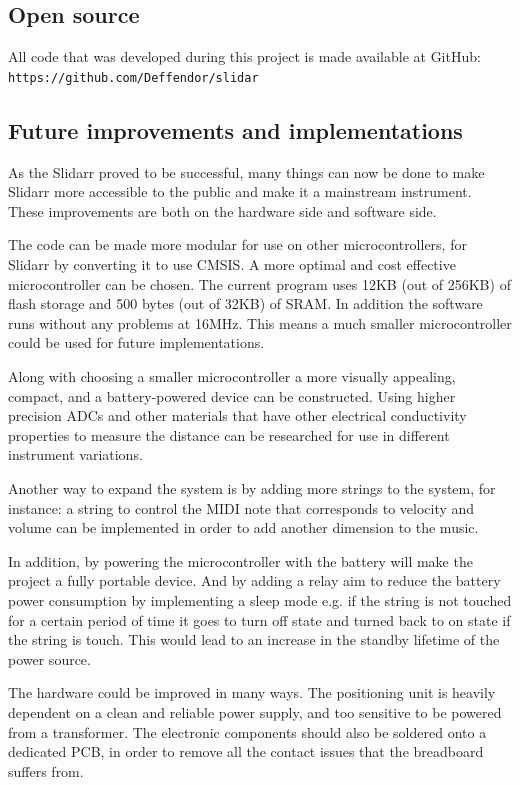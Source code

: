 \documentclass{article}
\begin{document}
\subsection{Open source}
All code that was developed during this project is made available at GitHub: \texttt{https://github.com/Deffendor/slidar}

\subsection{Future improvements and implementations}
As the Slidarr proved to be successful, many things can now be done to make Slidarr more accessible to the public and make it a mainstream instrument. These improvements are both on the hardware side and software side.

The code can be made more modular for use on other microcontrollers, for Slidarr by converting it to use CMSIS. A more optimal and cost effective microcontroller can be chosen. The current program uses 12KB (out of 256KB) of flash storage and 500 bytes (out of 32KB) of SRAM. In addition the software runs without any problems at 16MHz. This means a much smaller microcontroller could be used for future implementations.

Along with choosing a smaller microcontroller a more visually appealing, compact, and a battery-powered device can be constructed. Using higher precision ADCs and other materials that have other electrical conductivity properties to measure the distance can be researched for use in different instrument variations.

Another way to expand the system is by adding more strings to the system, for instance: a string to control the MIDI note that corresponds to velocity and volume can be implemented in order to add another dimension to the music.

In addition, by powering the microcontroller with the battery will make the project a fully portable device. And by adding a relay aim to reduce the battery power consumption by implementing a sleep mode e.g. if the string is not touched for a certain period of time it goes to turn off state and turned back to on state if the string is touch. This would lead to an increase in the standby lifetime of the power source.

The hardware could be improved in many ways. The positioning unit is heavily dependent on a clean and reliable power supply, and too sensitive to be powered from a transformer. The electronic components should also be soldered onto a dedicated PCB, in order to remove all the contact issues that the breadboard suffers from.
\end{document}
